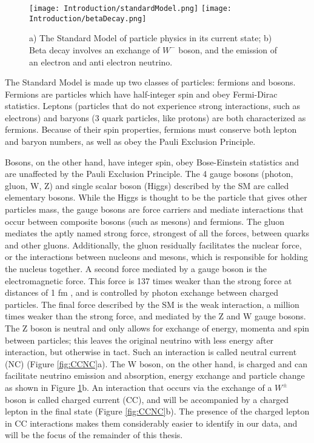 \begin{figure}[h!]
\centering
\texttt{[image: Introduction/standardModel.png]}
\hspace{6 mm}
\texttt{[image: Introduction/betaDecay.png]}
\caption{a) The Standard Model of particle physics in its current state; b) Beta decay involves an exchange of $W^-$ boson, and the emission of an electron and anti electron neutrino. }
\label{fig:SM}
\end{figure}
\par The Standard Model is made up two classes of particles: fermions and bosons. Fermions are particles which have half-integer spin and obey Fermi-Dirac statistics. Leptons (particles that do not experience strong interactions, such as electrons) and baryons (3 quark particles, like protons) are both characterized as fermions. Because of their spin properties, fermions must conserve both lepton and baryon numbers, as well as obey the Pauli Exclusion Principle. 
\par Bosons, on the other hand, have integer spin, obey Bose-Einstein statistics and are unaffected by the Pauli Exclusion Principle. The 4 gauge bosons (photon, gluon, W, Z) and single scalar boson (Higgs) described by the SM are called elementary bosons. While the Higgs is thought to be the particle that gives other particles mass, the gauge bosons are force carriers and mediate interactions that occur between composite bosons (such as mesons) and fermions.  The gluon mediates the aptly named strong force, strongest of all the forces, between quarks and other gluons. Additionally, the gluon residually facilitates the nuclear force, or the interactions between nucleons and mesons, which is responsible for holding the nucleus together. A second force mediated by a gauge boson is the electromagnetic force.  This force is 137 times weaker than the strong force at distances of 1 fm \cite{bib:forces}, and is controlled by photon exchange between charged particles. The final force described by the SM is the weak interaction, a million times weaker than the strong force, and mediated by the Z and W gauge bosons. The Z boson is neutral and only allows for exchange of energy, momenta and spin between particles; this leaves the original neutrino with less energy after interaction, but otherwise in tact. Such an interaction is called neutral current (NC) (Figure \ref{fig:CCNC}a). The W boson, on the other hand, is charged and can facilitate neutrino emission and absorption, energy exchange and particle change as shown in Figure \ref{fig:SM}b.  An interaction that occurs via the exchange of a $W^\pm$ boson is called charged current (CC), and will be accompanied by a charged lepton in the final state (Figure \ref{fig:CCNC}b). The presence of the charged lepton in CC interactions makes them considerably easier to identify in our data, and will be the focus of the remainder of this thesis. 

